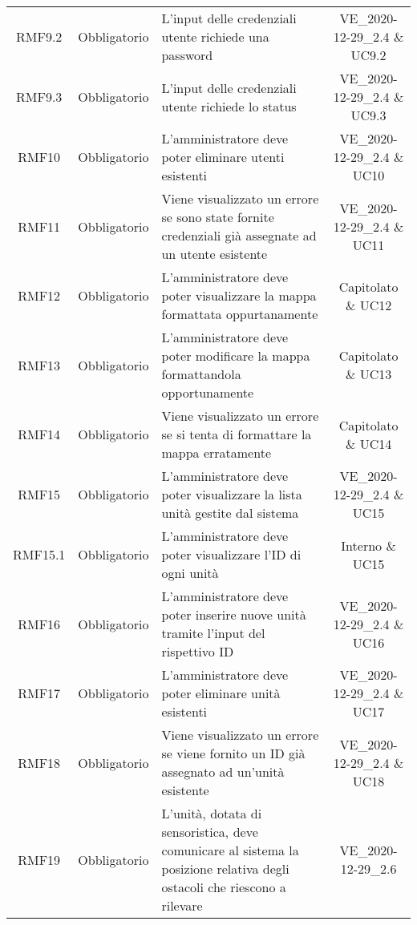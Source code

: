 \begin{longtable}[h!] { c c m{8cm} c}
		RMF9.2 & Obbligatorio & L'input delle credenziali utente richiede una password & VE\_2020-12-29\_2.4 \& UC9.2 \\

		RMF9.3 & Obbligatorio & L'input delle credenziali utente richiede lo status & VE\_2020-12-29\_2.4 \& UC9.3 \\

		RMF10 & Obbligatorio & L'amministratore deve poter eliminare utenti esistenti & VE\_2020-12-29\_2.4 \& UC10 \\

		RMF11 & Obbligatorio & Viene visualizzato un errore se sono state fornite credenziali già assegnate ad un utente esistente & VE\_2020-12-29\_2.4 \& UC11 \\

		RMF12 & Obbligatorio & L'amministratore deve poter visualizzare la mappa formattata oppurtanamente & Capitolato \& UC12 \\

		RMF13 & Obbligatorio & L'amministratore deve poter modificare la mappa formattandola opportunamente & Capitolato \& UC13 \\

		RMF14 & Obbligatorio & Viene visualizzato un errore se si tenta di formattare la mappa erratamente & Capitolato \& UC14 \\

		RMF15 & Obbligatorio & L'amministratore deve poter visualizzare la lista unità gestite dal sistema & VE\_2020-12-29\_2.4 \& UC15 \\

		RMF15.1 & Obbligatorio & L'amministratore deve poter visualizzare l'ID di ogni unità & Interno \& UC15 \\

		RMF16 & Obbligatorio & L'amministratore deve poter inserire nuove unità tramite l'input del rispettivo ID & VE\_2020-12-29\_2.4 \& UC16 \\

		RMF17& Obbligatorio & L'amministratore deve poter eliminare unità esistenti & VE\_2020-12-29\_2.4 \& UC17 \\

		RMF18 & Obbligatorio & Viene visualizzato un errore se viene fornito un ID già assegnato ad un'unità esistente & VE\_2020-12-29\_2.4 \& UC18 \\

		RMF19 & Obbligatorio & L'unità, dotata di sensoristica, deve comunicare al sistema la posizione relativa degli ostacoli che riescono a rilevare & VE\_2020-12-29\_2.6 \\


\end{longtable}
